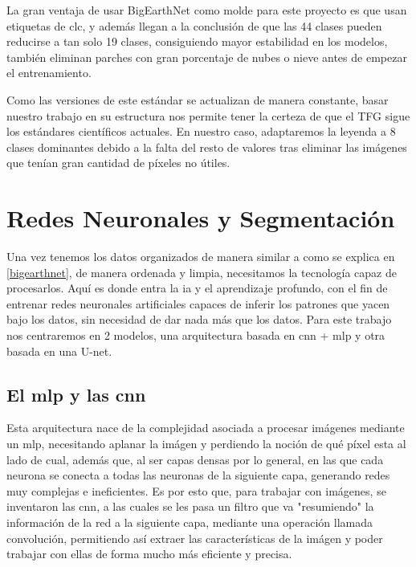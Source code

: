 La gran ventaja de usar BigEarthNet como molde para este proyecto es que usan etiquetas de \acrshort{clc}, y además llegan a la conclusión de
que las 44 clases pueden reducirse a tan solo 19 clases, consiguiendo mayor estabilidad en los modelos, también eliminan parches con gran porcentaje 
de nubes o nieve antes de empezar el entrenamiento.


Como las versiones de este estándar se actualizan de manera constante, basar nuestro trabajo en su estructura nos permite tener la certeza
de que el TFG sigue los estándares científicos actuales. En nuestro caso, adaptaremos la leyenda a 8 clases dominantes debido a la falta del resto
de valores tras eliminar las imágenes que tenían gran cantidad de píxeles no útiles.


\section{Redes Neuronales y Segmentación}
\label{cnns}

Una vez tenemos los datos organizados de manera similar a como se explica en \autoref{bigearthnet}, de manera ordenada y limpia, necesitamos
la tecnología capaz de procesarlos. Aquí es donde entra la \acrfull{ia} y el aprendizaje profundo, con el fin de entrenar redes neuronales 
artificiales capaces de inferir los patrones que yacen bajo los datos, sin necesidad de dar nada más que los datos. Para este trabajo nos 
centraremos en 2 modelos, una arquitectura basada en \acrshort{cnn} + \acrshort{mlp} y otra basada en una U-net.

\subsection{El \acrfull{mlp} y las \acrfull{cnn}}
\label{subsec: cnn}
Esta arquitectura nace de la complejidad asociada a procesar imágenes mediante un \acrshort{mlp}, necesitando aplanar la imágen y perdiendo
la noción de qué píxel esta al lado de cual, además que, al ser capas densas por lo general, en las que cada neurona se conecta a todas las 
neuronas de la siguiente capa, generando redes muy complejas e ineficientes. Es por esto que, para trabajar con imágenes, se inventaron las
\acrshort{cnn}, a las cuales se les pasa un filtro que va "resumiendo" la información de la red a la siguiente capa, mediante una operación
llamada convolución, permitiendo así extraer las características de la imágen y poder trabajar con ellas de forma mucho más eficiente y precisa.


